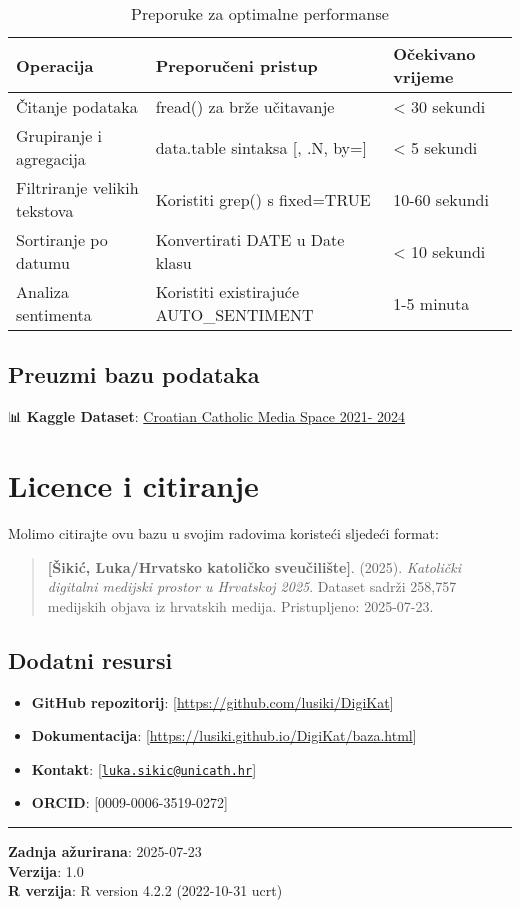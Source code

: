 \documentclass[
]{article}
\providecommand{\tightlist}{%
  \setlength{\itemsep}{0pt}\setlength{\parskip}{0pt}}
\begin{document}
\begin{longtable}[t]{lll}
\caption{\label{tab:performance-notes}Preporuke za optimalne performanse}\\
\toprule
Operacija & Preporučeni pristup & Očekivano vrijeme\\
\midrule
Čitanje podataka & fread() za brže učitavanje & < 30 sekundi\\
Grupiranje i agregacija & data.table sintaksa [, .N, by=] & < 5 sekundi\\
Filtriranje velikih tekstova & Koristiti grep() s fixed=TRUE & 10-60 sekundi\\
Sortiranje po datumu & Konvertirati DATE u Date klasu & < 10 sekundi\\
Analiza sentimenta & Koristiti existirajuće AUTO\_SENTIMENT & 1-5 minuta\\
\bottomrule
\end{longtable}

\subsection{Preuzmi bazu podataka}\label{preuzmi-bazu-podataka}

📊 \textbf{Kaggle Dataset}:
\href{https://www.kaggle.com/datasets/lukasikic/croatian-catholic-digital-media-space/data1}{Croatian
Catholic Media Space 2021- 2024}

\section{Licence i citiranje}\label{licence-i-citiranje}

Molimo citirajte ovu bazu u svojim radovima koristeći sljedeći format:

\begin{quote}
\textbf{{[}Šikić, Luka/Hrvatsko katoličko sveučilište{]}}. (2025).
\emph{Katolički digitalni medijski prostor u Hrvatskoj 2025}. Dataset
sadrži 258,757 medijskih objava iz hrvatskih medija. Pristupljeno:
2025-07-23.
\end{quote}

\subsection{Dodatni resursi}\label{dodatni-resursi}

\begin{itemize}
\tightlist
\item
  \textbf{GitHub repozitorij}:
  {[}\url{https://github.com/lusiki/DigiKat}{]}
\item
  \textbf{Dokumentacija}:
  {[}\url{https://lusiki.github.io/DigiKat/baza.html}{]}
\item
  \textbf{Kontakt}:
  {[}\href{mailto:luka.sikic@unicath.hr}{\nolinkurl{luka.sikic@unicath.hr}}{]}
\item
  \textbf{ORCID}: {[}0009-0006-3519-0272{]}
\end{itemize}

\begin{center}\rule{0.5\linewidth}{0.5pt}\end{center}

\textbf{Zadnja ažurirana}: 2025-07-23\\
\textbf{Verzija}: 1.0\\
\textbf{R verzija}: R version 4.2.2 (2022-10-31 ucrt)
\end{document}
